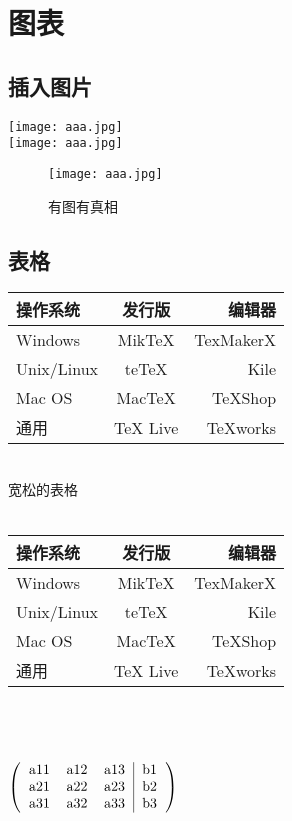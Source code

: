 \documentclass{article}
\begin{document}
\section{图表}
\subsection{插入图片}

\texttt{[image: aaa.jpg]}\\
\texttt{[image: aaa.jpg]}

\begin{figure}[htbp]
    \centering
    \texttt{[image: aaa.jpg]}
    \caption{有图有真相}
    \label{fig:myphoto}
\end{figure}

\subsection{表格}
\begin{tabular}{lc|r|}  %
    \hline
   操作系统& 发行版& 编辑器\\
    \hline
   Windows & MikTeX & TexMakerX \\
    \hline
   Unix/Linux & teTeX & Kile \\
    \hline
   Mac OS & MacTeX & TeXShop \\
    \hline
   通用& TeX Live & TeXworks \\
    \hline
   \end{tabular}\\

\renewcommand\arraystretch{2}  %
宽松的表格\\ \\
\begin{tabular}{|lc|r|}  
    \hline
   操作系统& 发行版& 编辑器\\
    \hline
   Windows & MikTeX & TexMakerX \\
    \hline
   Unix/Linux & teTeX & Kile \\
    \hline
   Mac OS & MacTeX & TeXShop \\
    \hline
   通用& TeX Live & TeXworks \\
    \hline
   \end{tabular}
 \\ \\ \\

$\left(\begin{tabular}{ccc|c}
        a11 & a12 & a13  & b1  \\
        a21 & a22  & a23 & b2  \\ 
        a31 & a32  & a33 & b3  \\     
\end{tabular}\right)$
\end{document}
